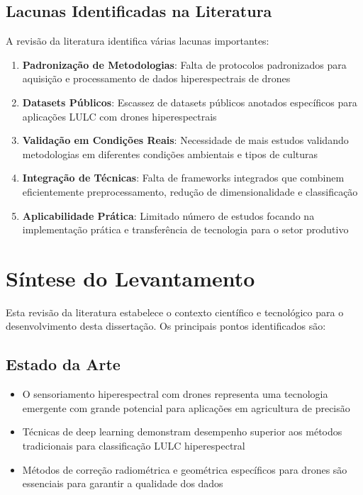 \subsection{Lacunas Identificadas na Literatura}
A revisão da literatura identifica várias lacunas importantes:

\begin{enumerate}
    \item \textbf{Padronização de Metodologias}: Falta de protocolos padronizados para aquisição e processamento de dados hiperespectrais de drones
    \item \textbf{Datasets Públicos}: Escassez de datasets públicos anotados específicos para aplicações LULC com drones hiperespectrais
    \item \textbf{Validação em Condições Reais}: Necessidade de mais estudos validando metodologias em diferentes condições ambientais e tipos de culturas
    \item \textbf{Integração de Técnicas}: Falta de frameworks integrados que combinem eficientemente preprocessamento, redução de dimensionalidade e classificação
    \item \textbf{Aplicabilidade Prática}: Limitado número de estudos focando na implementação prática e transferência de tecnologia para o setor produtivo
\end{enumerate}

\section{Síntese do Levantamento}\label{sec:sintese}

Esta revisão da literatura estabelece o contexto científico e tecnológico para o desenvolvimento desta dissertação. Os principais pontos identificados são:

\subsection{Estado da Arte}
\begin{itemize}
    \item O sensoriamento hiperespectral com drones representa uma tecnologia emergente com grande potencial para aplicações em agricultura de precisão
    \item Técnicas de deep learning demonstram desempenho superior aos métodos tradicionais para classificação LULC hiperespectral
    \item Métodos de correção radiométrica e geométrica específicos para drones são essenciais para garantir a qualidade dos dados
\end{itemize}

